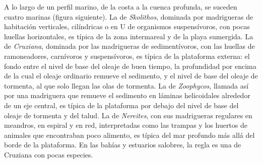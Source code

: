 A lo largo de un perfil marino, de la costa a la cuenca profunda, se suceden cuatro  marinas
(figura siguiente). La  de \emph{Skolithos}, dominada por madrigueras de habitación verticales, cilíndricas o
en U de organismos suspensívoros, con pocas huellas horizontales, es típica de la
zona intermareal y de la playa sumergida. La  de \emph{Cruziana}, dominada por las madrigueras de
sedimentívoros, con las huellas de ramoneadores, carnívoros y suspensívoros, es típica de la
plataforma externa: el fondo entre el nivel de base del oleaje de buen tiempo, la profundidad por encima de la cual el oleaje ordinario remueve
el sedimento, y el nivel de base del oleaje de tormenta, al que solo llegan las olas de tormenta. La  de \emph{Zoophycos},
llamada así por una madriguera que remueve el sedimento en láminas helicoidales alrededor de un eje
central, es típica de la plataforma por debajo del nivel de base del oleaje de tormenta y del talud. La  de \emph{Nereites},
con sus madrigueras regulares en meandros, en espiral y en red, interpretadas como las trampas y
los huertos de animales que encontraban poco alimento, es típica del mar profundo más allá del borde de la plataforma. En
las bahías y estuarios salobres, la regla es una  de Cruziana con pocas especies.

